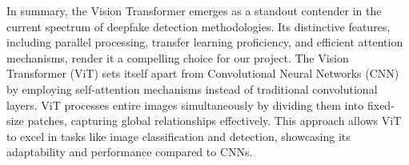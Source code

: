 In summary, the Vision Transformer emerges as a standout contender in the current spectrum of deepfake detection methodologies. Its distinctive features, including parallel processing, transfer learning proficiency, and efficient attention mechanisms, render it a compelling choice for our project. The Vision Transformer (ViT) sets itself apart from Convolutional Neural Networks (CNN) by employing self-attention mechanisms instead of traditional convolutional layers. ViT processes entire images simultaneously by dividing them into fixed-size patches, capturing global relationships effectively. This approach allows ViT to excel in tasks like image classification and detection, showcasing its adaptability and performance compared to CNNs.
